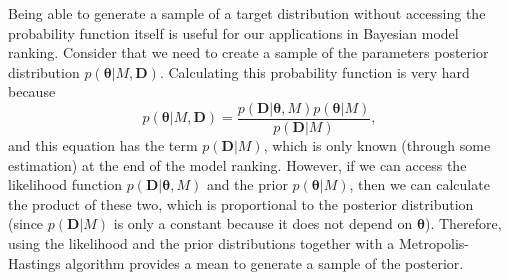 Being able to generate a sample of a target distribution without 
accessing the probability function itself is useful for our applications
in Bayesian model ranking. Consider that we need to create a sample of
the parameters posterior distribution $p ({\bm \theta} | M, {\bm D})$. 
Calculating this probability function is very hard because
\begin{equation*}
  p({\bm \theta} | M, {\bm D}) 
    = \frac{p ({\bm D} | {\bm \theta}, M) p ({\bm \theta} | M)}
      {p ({\bm D}|M)},
\end{equation*}
and this equation has the term $p ({\bm D}|M)$, which is only known 
(through some estimation) at the end of the model ranking. However, if 
we can access the likelihood function $p ({\bm D}| {\bm \theta}, M)$ and 
the prior $p ({\bm \theta} | M)$, then we can calculate the product of 
these two, which is proportional to the posterior distribution (since 
$p ({\bm D}|M)$ is only a constant because it does not depend on 
${\bm \theta}$). Therefore, using the likelihood and the prior 
distributions together with a Metropolis-Hastings algorithm provides a 
mean to generate a sample of the posterior.

